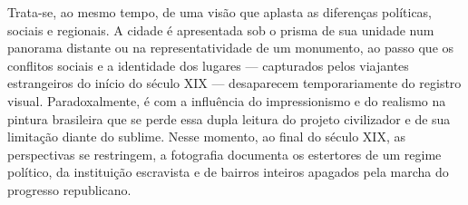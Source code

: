 Trata-se, ao mesmo tempo, de uma visão que aplasta as diferenças
políticas, sociais e regionais. A cidade é apresentada sob o prisma de
sua unidade num panorama distante ou na representatividade de um
monumento, ao passo que os conflitos sociais e a identidade dos lugares
--- capturados pelos viajantes estrangeiros do início do século XIX ---
desaparecem temporariamente do registro visual. Paradoxalmente, é com a
influência do impressionismo e do realismo na pintura brasileira que se
perde essa dupla leitura do projeto civilizador e de sua limitação
diante do sublime. Nesse momento, ao final do século XIX, as
perspectivas se restringem, a fotografia documenta os estertores de um
regime político, da instituição escravista e de bairros inteiros
apagados pela marcha do progresso republicano.
